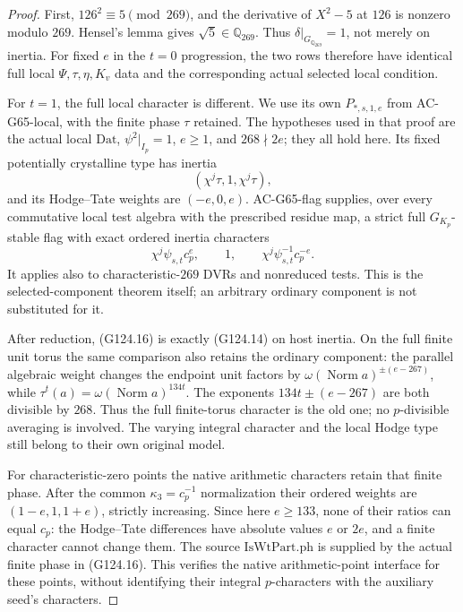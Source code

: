 \begin{proof}
First, \(126^2\equiv5\pmod {269}\), and the derivative of
\(X^2-5\) at \(126\) is nonzero modulo \(269\).  Hensel's
lemma gives \(\sqrt5\in\mathbb Q_{269}\).  Thus
\(\delta|_{G_{\mathbb Q_{269}}}=1\), not merely on inertia.
For fixed \(e\) in the \(t=0\) progression, the two rows
therefore have identical full local \(\Psi,\tau,\eta,K_v\)
data and the corresponding actual selected local condition.

For \(t=1\), the full local character is different.  We use
its own \(P_{*,s,1,e}\) from AC-G65-local, with the finite
phase \(\tau\) retained.  The hypotheses used in that proof
are the actual local \(\mathrm{Dat}\),
\(\psi^2|_{I_p}=1\), \(e\ge1\), and
\(268\nmid2e\); they all hold here.  Its fixed potentially
crystalline type has inertia
\[
                  (\chi^j\tau,1,\chi^j\tau),
 \tag{G124.15}
\]
and its Hodge--Tate weights are \((-e,0,e)\).
AC-G65-flag supplies, over every commutative local test
algebra with the prescribed residue map, a strict full
\(G_{K_p}\)-stable flag with exact ordered inertia characters
\[
        \chi^j\psi_{s,t}c_p^e,\qquad1,\qquad
                         \chi^j\psi_{s,t}^{-1}c_p^{-e}.
 \tag{G124.16}
\]
It applies also to characteristic-\(269\) DVRs and nonreduced
tests.  This is the selected-component theorem itself; an
arbitrary ordinary component is not substituted for it.

After reduction, (G124.16) is exactly (G124.14) on host
inertia.  On the full finite unit torus the same comparison
also retains the ordinary component: the parallel algebraic
weight changes the endpoint unit factors by
\(\omega(\operatorname{Norm}a)^{\pm(e-267)}\), while
\(\tau^t(a)=\omega(\operatorname{Norm}a)^{134t}\).
The exponents \(134t\pm(e-267)\) are both divisible by
\(268\).  Thus the full finite-torus character is the old
one; no \(p\)-divisible averaging is involved.
The varying integral character and the local Hodge type
still belong to their own original model.

For characteristic-zero points the native arithmetic
characters retain that finite phase.  After the common
\(\kappa_3=c_p^{-1}\) normalization their ordered weights
are \((1-e,1,1+e)\), strictly increasing.  Since here
\(e\ge133\), none of their ratios can equal \(c_p\):
the Hodge--Tate differences have absolute values \(e\) or
\(2e\), and a finite character cannot change them.
The source \(\mathrm{IsWtPart.ph}\) is supplied by the
actual finite phase in (G124.16).  This verifies the
native arithmetic-point interface for these points,
without identifying their integral \(p\)-characters with
the auxiliary seed's characters.


\end{proof}
